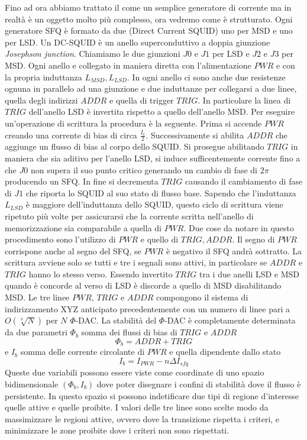Fino ad ora abbiamo trattato il  come un semplice generatore di corrente ma in realtà è un oggetto molto più complesso, ora vedremo come è strutturato. Ogni generatore SFQ è formato da due  (Direct Current SQUID) uno per MSD e uno per LSD. Un DC-SQUID è un anello superconduttivo a doppia giunzione \textit{Josephson junction}. Chiamiamo le due giunzioni $J0$ e $J1$ per LSD e $J2$ e $J3$ per MSD. Ogni anello e collegato in maniera diretta con l'alimentazione $PWR$ e con la propria induttanza $L_{MSD}, L_{LSD}$. In ogni anello ci sono anche due resistenze ognuna in parallelo ad una giunzione e due induttanze per collegarsi a due linee, quella degli indirizzi $ADDR$ e quella di trigger $TRIG$. In particolare la linea di $TRIG$ dell'anello LSD è invertita rispetto a quello dell'anello MSD. Per eseguire un'operazione di scrittura la procedura è la seguente. Prima si accende $PWR$ creando una corrente di bias di circa $\frac{I_c}{2}$. Successivamente si abilita $ADDR$ che aggiunge un flusso di bias al corpo dello SQUID. Si prosegue abilitando $TRIG$ in maniera che sia aditivo per l'anello LSD, si induce sufficentemente corrente fino a che $J0$ non supera il suo punto critico generando un cambio di fase di $2\pi$ producendo un SFQ.
In fine si decrementa $TRIG$ causando il cambiamento di fase di $J1$ che riporta lo SQUID al suo stato di flusso base. Sapendo che l'induttanza $L_{LSD}$ è maggiore dell'induttanza dello SQUID, questo ciclo di scrittura viene ripetuto più volte per assicurarsi che la corrente scritta nell'anello di memorizzazione sia comparabile a quella di $PWR$. Due cose da notare in questo procedimento sono l'utilizzo di $PWR$ e quello di $TRIG, ADDR$. Il segno di $PWR$ corrispone anche al segno del SFQ, se $PWR$ è negativo il SFQ andrà sottratto. La scrittura avviene solo se tutti e tre i segnali sono attivi, in particolare se $ADDR$ e $TRIG$ hanno lo stesso verso.  Essendo invertito $TRIG$ tra i due anelli LSD e MSD quando è concorde al verso di LSD è discorde a quello di MSD disabilitando MSD. Le tre linee $PWR$, $TRIG$ e $ADDR$ compongono il sistema di indirizzamento XYZ anticipato precedentemente con un numero di linee pari a $O(\sqrt[3]{N})$ per $N$ $\Phi$-DAC.
La stabilità del $\Phi$-DAC è completamente determinata da due parametri $\Phi_b$ somma dei flussi di bias di $TRIG$ e $ADDR$ $$\Phi_b = ADDR + TRIG$$
e $I_b$ somma delle corrente circolante di $PWR$ e quella dipendente dallo stato
$$I_b = I_{PWR} -n \Delta I_{sfq}$$
Queste due variabili possono essere viste come coordinate di uno spazio bidimensionale $(\Phi_b, I_b)$ dove poter disegnare i confini di stabilità dove il flusso è persistente. In questo spazio si possono indetificare due tipi di regione d'interesse quelle attive e quelle proibite. I valori delle tre linee sono scelte modo da massimizzare le regioni attive, ovvero dove la transizione rispetta i criteri, e minimizzare le zone proibite dove i criteri non sono rispettati.
